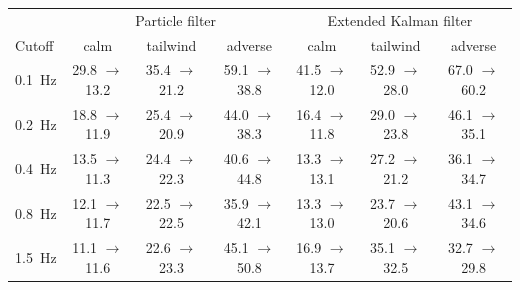 \begin{tabular}{@{}lcccccc@{}}
\toprule
 & \multicolumn{3}{c}{Particle filter} & \multicolumn{3}{c}{Extended Kalman filter} \\
Cutoff & calm & tailwind & adverse & calm & tailwind & adverse \\
\midrule
0.1~Hz & 29.8 $\to$ 13.2 & 35.4 $\to$ 21.2 & 59.1 $\to$ 38.8 & 41.5 $\to$ 12.0 & 52.9 $\to$ 28.0 & 67.0 $\to$ 60.2 \\
0.2~Hz & 18.8 $\to$ 11.9 & 25.4 $\to$ 20.9 & 44.0 $\to$ 38.3 & 16.4 $\to$ 11.8 & 29.0 $\to$ 23.8 & 46.1 $\to$ 35.1 \\
0.4~Hz & 13.5 $\to$ 11.3 & 24.4 $\to$ 22.3 & 40.6 $\to$ 44.8 & 13.3 $\to$ 13.1 & 27.2 $\to$ 21.2 & 36.1 $\to$ 34.7 \\
0.8~Hz & 12.1 $\to$ 11.7 & 22.5 $\to$ 22.5 & 35.9 $\to$ 42.1 & 13.3 $\to$ 13.0 & 23.7 $\to$ 20.6 & 43.1 $\to$ 34.6 \\
1.5~Hz & 11.1 $\to$ 11.6 & 22.6 $\to$ 23.3 & 45.1 $\to$ 50.8 & 16.9 $\to$ 13.7 & 35.1 $\to$ 32.5 & 32.7 $\to$ 29.8 \\
\bottomrule
\end{tabular}
